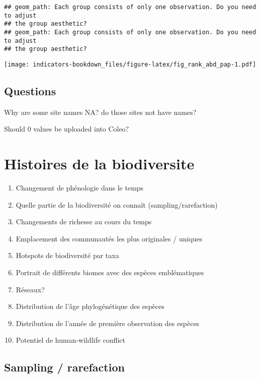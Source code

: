 \documentclass[
]{book}
\providecommand{\tightlist}{%
  \setlength{\itemsep}{0pt}\setlength{\parskip}{0pt}}
\begin{document}
\begin{verbatim}
## geom_path: Each group consists of only one observation. Do you need to adjust
## the group aesthetic?
## geom_path: Each group consists of only one observation. Do you need to adjust
## the group aesthetic?
\end{verbatim}

\texttt{[image: indicators-bookdown\_files/figure-latex/fig\_rank\_abd\_pap-1.pdf]}

\hypertarget{questions-2}{%
\section{Questions}\label{questions-2}}

Why are some site names NA? do those sites not have names?

Should 0 values be uploaded into Coleo?

\hypertarget{histoires-de-la-biodiversite}{%
\chapter{Histoires de la biodiversite}\label{histoires-de-la-biodiversite}}

\begin{enumerate}
\def\labelenumi{\arabic{enumi}.}
\tightlist
\item
  Changement de phénologie dans le temps
\item
  Quelle partie de la biodiversité on connaît (sampling/rarefaction)
\item
  Changements de richesse au cours du temps
\item
  Emplacement des communautés les plus originales / uniques
\item
  Hotspots de biodiversité par taxa
\item
  Portrait de différents biomes avec des espèces emblématiques
\item
  Réseaux?
\item
  Distribution de l'âge phylogénétique des espèces
\item
  Distribution de l'année de première observation des espèces
\item
  Potentiel de human-wildlife conflict
\end{enumerate}

\hypertarget{sampling-rarefaction}{%
\section{Sampling / rarefaction}\label{sampling-rarefaction}}
\end{document}
